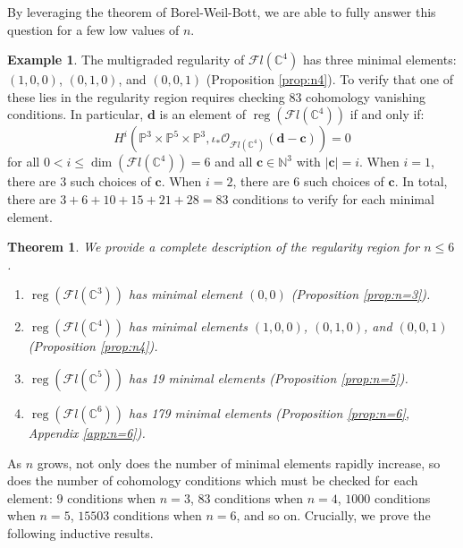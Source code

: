 \documentclass[12pt,reqno]{amsart}
\newtheorem{introtheorem}{Theorem}
\theoremstyle{definition}
\newtheorem{example}[theorem]{Example}
\theoremstyle{remark}
\newcommand{\reg}{\operatorname{reg}}
\newcommand{\calF}{{\mathcal{F}}}
\newcommand{\calO}{{\mathcal{O}}}
\begin{document}
By leveraging the theorem of Borel-Weil-Bott, we are able to fully answer this question for a few low values of $n$.

\begin{example}\label{ex:n=4Intro}
    The multigraded regularity of $\calF l(\mathbb C^4)$ has three minimal elements: $(1,0,0)$, $(0,1,0)$, and $(0,0,1)$ (Proposition \ref{prop:n4}).  To verify that one of these lies in the regularity region requires checking 83 cohomology vanishing conditions.  In particular, $\mathbf d$ is an element of $\reg(\calF l(\mathbb C^4))$ if and only if:
    \[
H^i(\mathbb P^3 \times \mathbb P^5 \times \mathbb P^3, \iota_*\calO_{\calF l(\mathbb  C^4)}(\mathbf d - \mathbf c)) = 0
\]
    for all $0<i\leq \dim(\calF l(\mathbb C^4)) = 6$ and all $\mathbf c \in \mathbb N^3$ with $|\mathbf c| = i$.  When $i = 1$, there are $3$ such choices of $\mathbf c$.  When $i = 2$, there are $6$ such choices of $\mathbf c$.  In total, there are $3 + 6 + 10 + 15 + 21  + 28 = 83$ conditions to verify for each minimal element.
\end{example}

\begin{introtheorem}
We provide a complete description of the regularity region for $n \leq 6$.
\begin{enumerate}
    \item $\reg(\calF l(\mathbb C^3))$ has minimal element $(0,0)$ (Proposition \ref{prop:n=3}).
    \item $\reg(\calF l(\mathbb C^4))$ has minimal elements $(1,0,0)$, $(0,1,0)$, and $(0,0,1)$ (Proposition \ref{prop:n4}).
    \item $\reg(\calF l(\mathbb C^5))$ has 19 minimal elements (Proposition \ref{prop:n=5}).
    \item $\reg(\calF l(\mathbb C^6))$ has 179 minimal elements (Proposition \ref{prop:n=6}, Appendix \ref{app:n=6}).
\end{enumerate}
\end{introtheorem}

As $n$ grows, not only does the number of minimal elements rapidly increase, so does the number of cohomology conditions which must be checked for each element: $9$ conditions when $n=3$, $83$ conditions when $n=4$, $1000$ conditions when $n=5$, $15503$ conditions when $n=6$, and so on.  Crucially, we prove the following inductive results.
\end{document}
